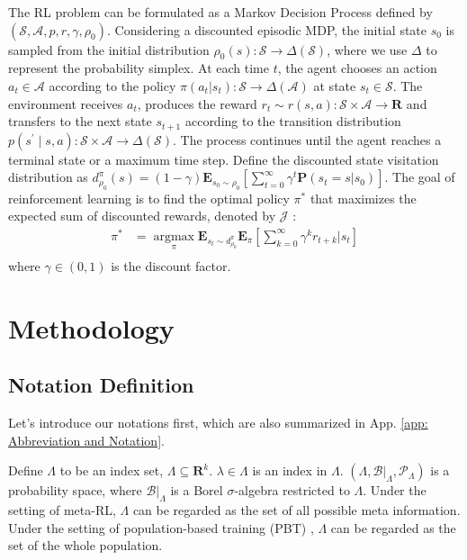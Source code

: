 \documentclass[nohyperref]{article}
\theoremstyle{plain}
\begin{document}
 The RL problem can be formulated as a Markov Decision Process \citep[MDP]{howard1960dynamic} defined by $\left(\mathcal{S}, \mathcal{A}, p, r, \gamma, \rho_{0}\right)$. 
 Considering a discounted episodic MDP, the initial state $s_0$ is sampled from the initial distribution $\rho_0(s): \mathcal{S} \rightarrow \Delta(\mathcal{S})$, where we use $\Delta$ to represent the probability simplex.
 At each time $t$, the agent chooses an action $a_t \in \mathcal{A}$ according to the policy $\pi(a_t|s_t): \mathcal{S} \rightarrow \Delta(\mathcal{A})$ at state $s_t \in \mathcal{S}$. 
 The environment receives $a_t$, produces the reward $r_t \sim r(s,a): \mathcal{S} \times \mathcal{A} \rightarrow \mathbf{R}$ and transfers to the next state $s_{t+1}$  according to the transition distribution $p\left(s^{\prime} \mid s, a\right): \mathcal{S} \times \mathcal{A} \rightarrow \Delta(\mathcal{S})$. 
 The process continues until the agent reaches a terminal state or a maximum time step. 
 Define the discounted state visitation distribution as 
 $d_{\rho_0}^{\pi} (s) = (1 - \gamma) \textbf{E}_{s_0 \sim \rho_0} 
 \left[ \sum_{t=0}^{\infty} \gamma^t \textbf{P} (s_t = s | s_0) \right]$.
 The goal of reinforcement learning is to find the optimal policy $\pi^*$ that maximizes the expected sum of discounted rewards, denoted by $\mathcal{J}$ \citep{sutton}:
\begin{equation}
\label{eq_accmulate_reward}
\begin{aligned}
\pi^{*}
&= \underset{\pi}{\operatorname{argmax}} \textbf{E}_{s_t \sim d_{\rho_0}^{\pi}} \textbf{E}_{\pi} \left[\sum_{k=0}^{\infty} \gamma^{k} r_{t+k} | s_t \right] \\
\end{aligned}
\end{equation}
where $\gamma \in(0,1)$ is the discount factor.


\section{Methodology}
\label{Sec: Methodology}
\subsection{Notation Definition}

Let's introduce our notations first, which are also summarized in App. \ref{app: Abbreviation and Notation}.

Define $\Lambda$ to be an index set, $\Lambda \subseteq \textbf{R}^k$.
$\lambda \in \Lambda$ is an index in $\Lambda$.
$(\Lambda, \mathcal{B}|_{\Lambda}, \mathcal{P}_{\Lambda})$ is a probability space, where $\mathcal{B}|_{\Lambda}$ is a Borel $\sigma$-algebra restricted to $\Lambda$.
Under the setting of meta-RL, $\Lambda$ can be regarded as the set of all possible meta information.
Under the setting of population-based training (PBT) \citep{PBT}, $\Lambda$ can be regarded as the set of the whole population.
\end{document}
